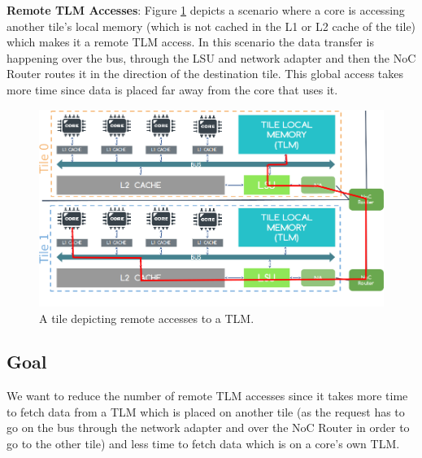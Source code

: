\documentclass{listhesis}
\begin{document}
\par
\textbf{Remote TLM Accesses}: Figure \ref{fig:remoteaccesses} depicts a scenario where a core is accessing another tile's local memory (which is not cached in the L1 or L2 cache of the tile) which makes it a remote TLM access. In this scenario the data transfer is happening over the bus, through the LSU and network adapter and then the NoC Router routes it in the direction of the destination tile. This global access takes more time since data is placed far away from the core that uses it. 
\begin{figure}
  \includegraphics[width=\linewidth]{remoteaccesses.png}
  \centering
  \caption{A tile depicting remote accesses to a TLM.}
  \label{fig:remoteaccesses}
\end{figure}
\subsection{Goal}
We want to reduce the number of remote TLM accesses since it takes more time to fetch data from a TLM which is placed on another tile (as the request has to go on the bus through the network adapter and over the NoC Router in order to go to the other tile) and less time to fetch data which is on a core's own TLM.  
\end{document}
